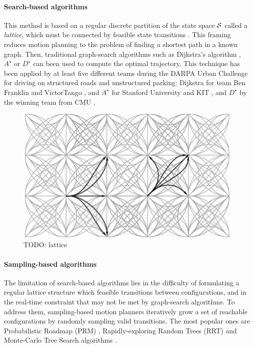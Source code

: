 \paragraph{Search-based algorithms}

This method is based on a regular discrete partition of the state space $\mathcal{S}$ called a \emph{lattice}, which must be connected by feasible state transitions \citep[\eg][]{Pivtoraiko2005}. This framing reduces motion planning to the problem of finding a shortest path in a known graph. Then, traditional graph-search algorithms such as Dijkstra's algorithm \citep{Dijkstra1959}, $A^\star$ \citep{Hart1968} or $D^\star$ \citep{Stentz1994} can been used to compute the optimal trajectory. This technique has been applied by at least five different teams during the DARPA Urban Challenge for driving on structured roads and unstructured parking: Dijkstra for team Ben Franklin \citep{Bohren2008} and VictorTango \citep{Bacha2008}, and $A^\star$ for Stanford University \citep{Montemerlo2008} and KIT \citep{Kammel2008}, and $D^\star$ by the winning team from CMU \citep{Urmson2008}.

\begin{figure}[tp]
	\centering
	\includegraphics[width=0.5\linewidth]{img/lattice2}
	\caption{TODO: lattice}
\end{figure}

\paragraph{Sampling-based algorithms}

The limitation of search-based algorithms lies in the difficulty of formulating a regular lattice structure which feasible transitions between configurations, and in the real-time constraint that may not be met by graph-search algorithms. To address them, sampling-based motion planners iteratively grow a set of reachable configurations by randomly sampling valid transitions. The most popular ones are Probabilistic Roadmap (PRM) \citep{Kavraki1996}, Rapidly-exploring Random Trees (RRT) \citep{Lavalle98,Karaman2011} and Monte-Carlo Tree Search algorithms \citep[e.g.][]{Kocsis2006}.

